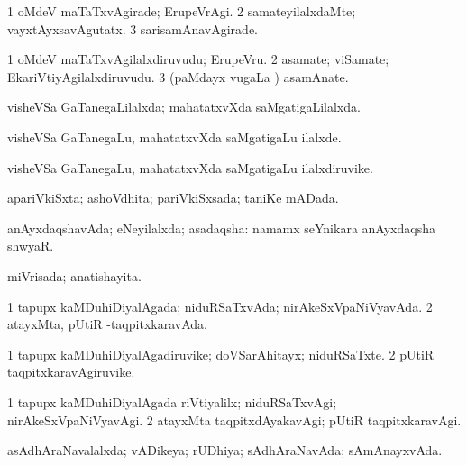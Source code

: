 \bentry
{} 
\gl{\kirxvi}
\expl{}
\bmng
\bnum
\num{1} oMdeV maTaTxvAgirade; ErupeVrAgi. 
\num{2} samateyilalxdaMte; vayxtAyxsavAgutatx. 
\num{3} sarisamAnavAgirade. 
\enum
\emng
\eentry

\bentry
{} 
\gl{\nA}
\expl{}
\bmng
\bnum
\num{1} oMdeV maTaTxvAgilalxdiruvudu; ErupeVru. 
\num{2} asamate; viSamate; EkariVtiyAgilalxdiruvudu. 
\num{3} (paMdayx \mo vugaLa \vi) asamAnate. 
\enum
\emng
\eentry

\bentry
{} 
\gl{\gu}
\expl{}
\bmng
 visheVSa GaTanegaLilalxda; mahatatxvXda saMgatigaLilalxda. 
\emng
\eentry

\bentry
{} 
\gl{\kirxvi}
\expl{}
\bmng
 visheVSa GaTanegaLu, mahatatxvXda saMgatigaLu ilalxde. 
\emng
\eentry

\bentry
{} 
\gl{\nA}
\expl{}
\bmng
 visheVSa GaTanegaLu, mahatatxvXda saMgatigaLu ilalxdiruvike. 
\emng
\eentry

\bentry
{} 
\gl{\gu}
\expl{}
\bmng
 apariVkiSxta; ashoVdhita; pariVkiSxsada; taniKe mADada. 
\emng
\eentry

\bentry
{} 
\gl{\gu}
\expl{}
\bmng
 anAyxdaqshavAda; eNeyilalxda; asadaqsha:  namamx seYnikara anAyxdaqsha shwyaR. 
\emng
\eentry

\bentry
{} 
\gl{\gu}
\expl{}
\bmng
 miVrisada; anatishayita. 
\emng
\eentry

\bentry
{} 
\gl{\gu}
\expl{}
\bmng
\bnum
\num{1} tapupx kaMDuhiDiyalAgada; niduRSaTxvAda; nirAkeSxVpaNiVyavAda. 
\num{2} atayxMta, pUtiR -taqpitxkaravAda. 
\enum
\emng
\eentry

\bentry
{} 
\gl{\nA}
\expl{}
\bmng
\bnum
\num{1} tapupx kaMDuhiDiyalAgadiruvike; doVSarAhitayx; niduRSaTxte. 
\num{2} pUtiR taqpitxkaravAgiruvike. 
\enum
\emng
\eentry

\bentry
{} 
\gl{\kirxvi}
\expl{}
\bmng
\bnum
\num{1} tapupx kaMDuhiDiyalAgada riVtiyalilx; niduRSaTxvAgi; nirAkeSxVpaNiVyavAgi. 
\num{2} atayxMta taqpitxdAyakavAgi; pUtiR taqpitxkaravAgi. 
\enum
\emng
\eentry

\bentry
{} 
\gl{\gu}
\expl{}
\bmng
 asAdhAraNavalalxda; vADikeya; rUDhiya; sAdhAraNavAda; sAmAnayxvAda. 
\emng
\eentry

